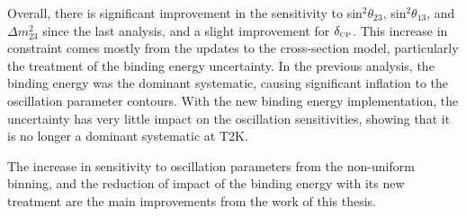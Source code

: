 Overall, there is significant improvement in the sensitivity to sin$^2\theta_{23}$, sin$^2\theta_{13}$, and $\Delta m^{2}_{23}$ since the last analysis, and a slight improvement for $\delta_{\scriptscriptstyle\mathrm{CP}}$. This increase in constraint comes mostly from the updates to the cross-section model, particularly the treatment of the binding energy uncertainty. In the previous analysis, the binding energy was the dominant systematic, causing significant inflation to the oscillation parameter contours. With the new binding energy implementation, the uncertainty has very little impact on the oscillation sensitivities, showing that it is no longer a dominant systematic at T2K. 

The increase in sensitivity to oscillation parameters from the non-uniform binning, and the reduction of impact of the binding energy with its new treatment are the main improvements from the work of this thesis.

\newpage
